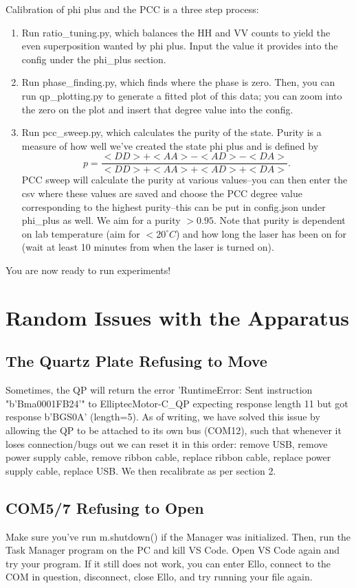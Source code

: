 \documentclass{paper}[11pt]
\begin{document}
Calibration of phi plus and the PCC is a three step process:
\begin{enumerate}
    \item Run ratio\_tuning.py, which balances the HH and VV counts to yield the even superposition wanted by phi plus. Input the value it provides into the config under the phi\_plus section.
    \item Run phase\_finding.py, which finds where the phase is zero. Then, you can run qp\_plotting.py to generate a fitted plot of this data; you can zoom into the zero on the plot and insert that degree value into the config. 
    \item Run pcc\_sweep.py, which calculates the purity of the state. Purity is a measure of how well we've created the state phi plus and is defined by $$p = \frac{<DD> + <AA> - <AD> - <DA>}{<DD> + <AA> + <AD> + <DA>}.$$ PCC sweep will calculate the purity at various values--you can then enter the csv where these values are saved and choose the PCC degree value corresponding to the highest purity--this can be put in config.json under phi\_plus as well. We aim for a purity $>0.95$. Note that purity is dependent on lab temperature (aim for $<20^\circ C$) and how long the laser has been on for (wait at least 10 minutes from when the laser is turned on).
\end{enumerate}
You are now ready to run experiments! 

\section{Random Issues with the Apparatus}
\subsection{The Quartz Plate Refusing to Move}
Sometimes, the QP will return the error 'RuntimeError: Sent instruction "b'Bma0001FB24'" to ElliptecMotor-C\_QP expecting response length 11 but got response b'BGS0A' (length=5). As of writing, we have solved this issue by allowing the QP to be attached to its own bus (COM12), such that whenever it loses connection/bugs out we can reset it in this order: remove USB, remove power supply cable, remove ribbon cable, replace ribbon cable, replace power supply cable, replace USB. We then recalibrate as per section 2.
\subsection{COM5/7 Refusing to Open}
Make sure you've run m.shutdown() if the Manager was initialized. Then, run the Task Manager program on the PC and kill VS Code. Open VS Code again and try your program. If it still does not work, you can enter Ello, connect to the COM in question, disconnect, close Ello, and try running your file again. 
\end{document}
